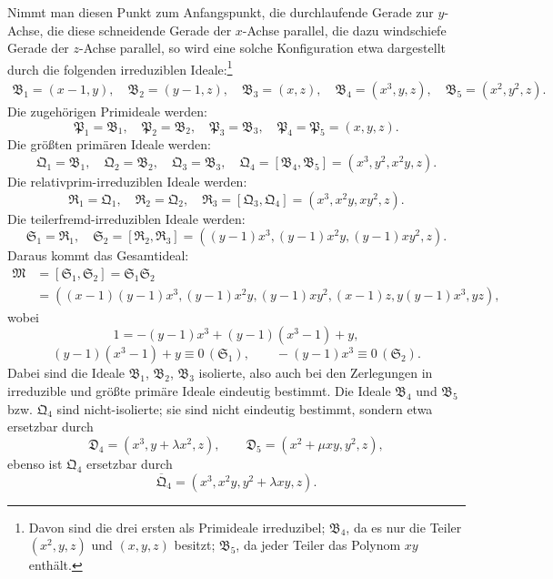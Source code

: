 \documentclass[11pt]{article}
\newcommand{\ideal}[1]{\mathfrak{#1}}
\newcommand{\eqzero}[1]{\equiv 0\,(#1)}
\begin{document}
Nimmt man diesen Punkt zum Anfangspunkt, die durchlaufende Gerade zur $y$-Achse, die diese schneidende Gerade der $x$-Achse parallel, die dazu windschiefe Gerade der $z$-Achse parallel, so wird eine solche Konfiguration etwa dargestellt durch die folgenden irreduziblen Ideale:\footnote{Davon sind die drei ersten als Primideale irreduzibel; $\ideal B_4$, da es nur die Teiler $(x^2,y,z)$ und $(x,y,z)$ besitzt; $\ideal B_5$, da jeder Teiler das Polynom $xy$ enthält.}
\[
\begin{gathered}
 \ideal B_1=(x-1,y),\quad
 \ideal B_2=(y-1,z),\quad
 \ideal B_3=(x,z),\quad
 \ideal B_4=(x^3,y,z),\quad
 \ideal B_5=(x^2,y^2,z). 
\end{gathered}
\]
Die zugehörigen Primideale werden:
\[
 \ideal P_1=\ideal B_1,
 \quad \ideal P_2=\ideal B_2,
 \quad \ideal P_3=\ideal B_3,
 \quad \ideal P_4=\ideal P_5=(x,y,z).
\]
Die größten primären Ideale werden:
\[
 \ideal Q_1=\ideal B_1,
 \quad \ideal Q_2=\ideal B_2,
 \quad \ideal Q_3=\ideal B_3,
 \quad \ideal Q_4=[\ideal B_4,\ideal B_5]=(x^3,y^2,x^2y,z).
\]
Die relativprim-irreduziblen Ideale werden:
\[
 \ideal R_1=\ideal Q_1,
 \quad \ideal R_2=\ideal Q_2,
 \quad \ideal R_3=[\ideal Q_3,\ideal Q_4]=(x^3,x^2y,xy^2,z).
\]
Die teilerfremd-irreduziblen Ideale werden:
\[
 \ideal S_1=\ideal R_1,
 \quad
 \ideal S_2=[\ideal R_2,\ideal R_3]=((y-1)x^3,(y-1)x^2y,(y-1)xy^2,z).
\]
Daraus kommt das Gesamtideal:
\[
\begin{aligned}
 \ideal M&=[\ideal S_1,\ideal S_2]=\ideal S_1\ideal S_2 \\
 &=((x-1)(y-1)x^3,(y-1)x^2y,(y-1)xy^2,(x-1)z,y(y-1)x^3,yz),
\end{aligned}
\]
wobei
\[
 1=-(y-1)x^3+(y-1)(x^3-1)+y,
\]
\[
 (y-1)(x^3-1)+y\eqzero{\ideal S_1},
 \qquad -(y-1)x^3\eqzero{\ideal S_2}.
\]
Dabei sind die Ideale $\ideal B_1$, $\ideal B_2$, $\ideal B_3$ isolierte, also auch bei den Zerlegungen in irreduzible und größte primäre Ideale eindeutig bestimmt. Die Ideale $\ideal B_4$ und $\ideal B_5$ bzw. $\ideal Q_4$ sind nicht-isolierte; sie sind nicht eindeutig bestimmt, sondern etwa ersetzbar durch
\[
 \ideal D_4=(x^3,y+\lambda x^2,z),
 \qquad
 \ideal D_5=(x^2+\mu xy,y^2,z),
\]
ebenso ist $\ideal Q_4$ ersetzbar durch
\[
 \overline{\ideal Q}_4=(x^3,x^2y,y^2+\lambda xy,z).
\]
\end{document}
